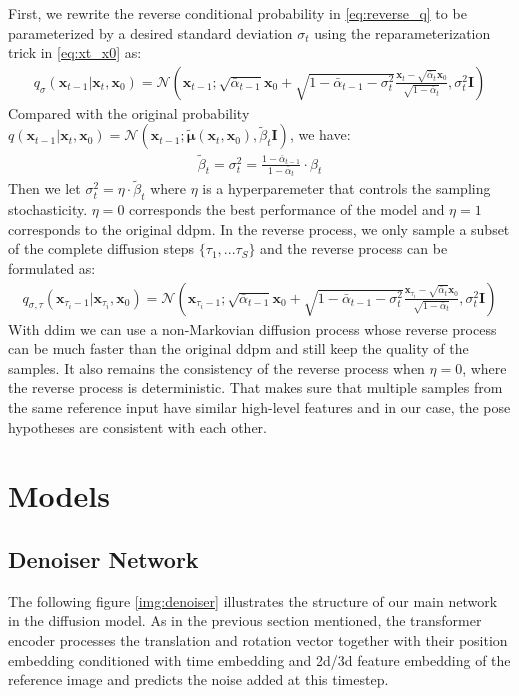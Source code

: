 \documentclass[12pt,DIV14,BCOR12mm,a4paper,footinclude=false,headinclude,parskip=half-,twoside,openright,cleardoublepage=empty,toc=index,bibliography=totoc,listof=totoc]{scrreprt}
\numberwithin{equation}{chapter}
\begin{document}
First, we rewrite the reverse conditional probability in \ref{eq:reverse_q} to be parameterized by a desired standard deviation $\sigma_{t}$ using the reparameterization trick in \ref{eq:xt_x0} as:
\begin{align}
  q_{\sigma}(\mathbf{x}_{t-1}|\mathbf{x}_{t},\mathbf{x}_{0}) = \mathcal{N} (\mathbf{x}_{t-1}; \sqrt{\bar{\alpha}_{t-1}}\mathbf{x}_{0}+\sqrt{1-\bar{\alpha}_{t-1} - \sigma_{t}^{2}}\frac{\mathbf{x}_{t}-\sqrt{\bar{\alpha}_{t}}\mathbf{x}_{0}}{\sqrt{1-\bar{\alpha}_{t}}}, \sigma_{t}^{2}\mathbf{I})
\end{align}
Compared with the original probability $q(\mathbf{x}_{t-1}|\mathbf{x}_{t},\mathbf{x}_{0}) = \mathcal{N} (\mathbf{x}_{t-1}; \boldsymbol{\tilde{\mu}}(\mathbf{x}_{t}, \mathbf{x}_{0}), \tilde{\beta}_{t}\mathbf{I})$, we have:
\begin{align}
  \tilde{\beta}_{t}=\sigma_{t}^{2}=\frac{1-\bar{\alpha}_{t-1}}{1-\bar{\alpha}_{t}}\cdot\beta_{t}
\end{align}
Then we let $\sigma_{t}^{2}=\eta\cdot\tilde{\beta}_{t}$ where $\eta$ is a hyperparemeter that controls the sampling stochasticity. $\eta=0$ corresponds the best performance of the model and $\eta=1$ corresponds to the original \gls{ddpm}. In the reverse process, we only sample a subset of the complete diffusion steps $\{\tau_{1},...\tau_{S}\}$ and the reverse process can be formulated as:
\begin{align}
  q_{\sigma,\tau}(\mathbf{x}_{\tau_{i}-1}|\mathbf{x}_{\tau_{i}},\mathbf{x}_{0}) = \mathcal{N} (\mathbf{x}_{\tau_{i}-1}; \sqrt{\bar{\alpha}_{t-1}}\mathbf{x}_{0}+\sqrt{1-\bar{\alpha}_{t-1} - \sigma_{t}^{2}}\frac{\mathbf{x}_{\tau_{i}}-\sqrt{\bar{\alpha}_{t}}\mathbf{x}_{0}}{\sqrt{1-\bar{\alpha}_{t}}}, \sigma_{t}^{2}\mathbf{I})
\end{align}
With \gls{ddim} we can use a non-Markovian diffusion process whose reverse process can be much faster than the original \gls{ddpm} and still keep the quality of the samples. It also remains the consistency of the reverse process when $\eta=0$, where the reverse process is deterministic. That makes sure that multiple samples from the same reference input have similar high-level features and in our case, the pose hypotheses are consistent with each other.
\section{Models}
\subsection{Denoiser Network}
The following figure \ref{img:denoiser} illustrates the structure of our main network in the diffusion model. As in the previous section mentioned, the transformer encoder processes the translation and rotation vector together with their position embedding conditioned with time embedding and \gls{2d}/\gls{3d} feature embedding of the reference image and predicts the noise added at this timestep. 
\end{document}
